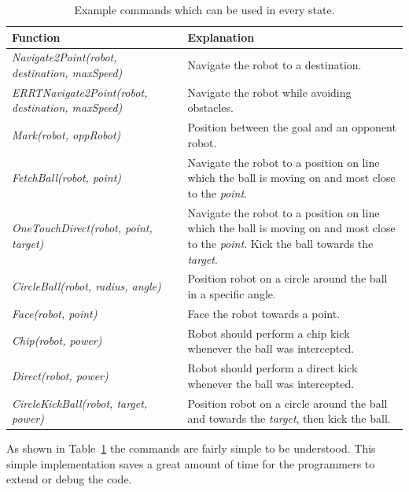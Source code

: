 \documentclass[runningheads]{llncs}
\begin{document}
\begin{table}[H]
\caption{Example commands which can be used in every state.}\label{tab1}
\begin{tabular}{|p{7.5cm}|p{6cm}|}
\hline
Function &  Explanation \\
\hline
{\itshape Navigate2Point(robot, destination, maxSpeed)} & Navigate the robot to a destination.\\
{\itshape ERRTNavigate2Point(robot, destination, maxSpeed)} & Navigate the robot while avoiding obstacles.\\
{\itshape Mark(robot, oppRobot)} & Position between the goal and an opponent robot.\\
{\itshape FetchBall(robot, point)} & Navigate the robot to a position on line which the ball is moving on and most close to the \textit{point}.\\
{\itshape OneTouchDirect(robot, point, target)} & Navigate the robot to a position on line which the ball is moving on and most close to the \textit{point}. Kick the ball towards the \textit{target}.\\
{\itshape CircleBall(robot, radius, angle)} & Position robot on a circle around the ball in a specific angle.\\
{\itshape Face(robot, point)} & Face the robot towards a point.\\
{\itshape Chip(robot, power)} & Robot should perform a chip kick whenever the ball was intercepted.\\
{\itshape Direct(robot, power)} & Robot should perform a direct kick whenever the ball was intercepted.\\
{\itshape CircleKickBall(robot, target, power)} & Position robot on a circle around the ball and towards the \textit{target}, then kick the ball.\\
\hline
\end{tabular}
\end{table}

As shown in Table~\ref{tab1} the commands are fairly simple to be understood. This simple implementation saves a great amount of time for the programmers to extend or debug the code.
\end{document}
